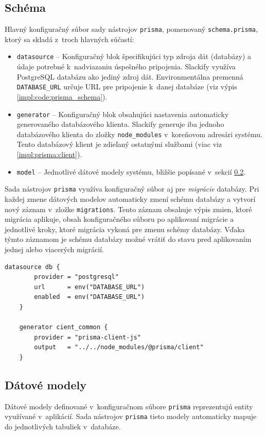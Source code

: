 \subsection{Schéma}
Hlavný konfiguračný súbor sady nástrojov \texttt{prisma}, pomenovaný \texttt{schema.prisma}, ktorý sa skladá z~troch hlavných súčastí:

\begin{itemize}
	\item \texttt{datasource} -- Konfiguračný blok špecifikujúci typ zdroja dát (databázy) a údaje potrebné k~nadviazaniu úspešného pripojenia. Slackify využíva PostgreSQL databázu ako jediný zdroj dát. Environmentálna premenná \texttt{DATABASE\_URL} určuje URL pre pripojenie k~danej databáze (viz výpis \ref{impl:code:prisma_schema}).
	\item \texttt{generator} -- Konfiguračný blok obsahujúci nastavenia automaticky generovaného databázového klienta. Slackify generuje iba jednoho databázového klienta do zložky \texttt{node\_modules} v~koreňovom adresári systému. Tento databázový klient je zdieľaný ostatnými službami (viac viz \ref{impl:prisma:client}).
	\item \texttt{model} -- Jednotlivé dátové modely systému, bližšie popísané v~sekcií \ref{impl:data_models}.
\end{itemize}

\noindent Sada nástrojov \texttt{prisma} využíva konfiguračný súbor aj pre \emph{migrácie} databázy. Pri každej zmene dátových modelov automaticky zmení schému databázy a vytvorí nový záznam v~zložke \texttt{migrations}. Tento záznam obsahuje výpis zmien, ktoré migrácia aplikuje, obsah konfiguračného súboru po aplikovaní migrácie a jednotlivé kroky, ktoré migrácia vykoná pre zmenu schémy databázy. Vďaka týmto záznamom je schému databázy možné vrátiť do stavu pred aplikovaním jednej alebo viacerých migrácií.

\begin{lstlisting}[label={impl:code:prisma_schema}, caption=Špecifikácia \texttt{datasource} a \texttt{generator} v~konfiguračnom súbore \texttt{prisma}.]
	datasource db {
		provider = "postgresql"
		url      = env("DATABASE_URL")
		enabled  = env("DATABASE_URL")
	}

	generator cient_common {
		provider = "prisma-client-js"
		output   = "../../node_modules/@prisma/client"
	}
\end{lstlisting}

\subsection{Dátové modely}
\label{impl:data_models}
Dátové modely definované v~konfiguračnom súbore \texttt{prisma} reprezentujú entity využívané v~aplikácií. Sada nástrojov \texttt{prisma} tieto modely automaticky mapuje do jednotlivých tabuliek v~databáze. \\

